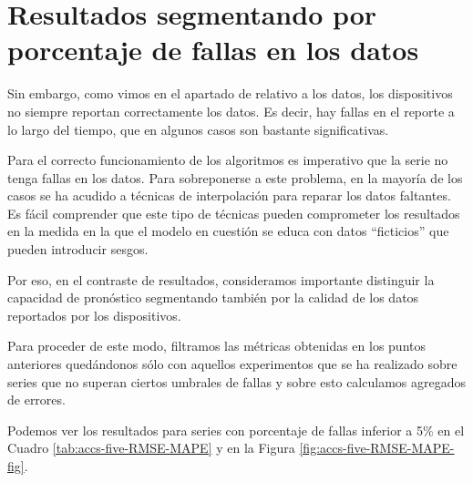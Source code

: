 \documentclass[]{book}
\begin{document}
\section{Resultados segmentando por porcentaje de fallas en los
datos}\label{resultados-segmentando-por-porcentaje-de-fallas-en-los-datos}

Sin embargo, como vimos en el apartado de relativo a los datos, los
dispositivos no siempre reportan correctamente los datos. Es decir, hay
fallas en el reporte a lo largo del tiempo, que en algunos casos son
bastante significativas.

Para el correcto funcionamiento de los algoritmos es imperativo que la
serie no tenga fallas en los datos. Para sobreponerse a este problema,
en la mayoría de los casos se ha acudido a técnicas de interpolación
para reparar los datos faltantes. Es fácil comprender que este tipo de
técnicas pueden comprometer los resultados en la medida en la que el
modelo en cuestión se educa con datos ``ficticios'' que pueden
introducir sesgos.

Por eso, en el contraste de resultados, consideramos importante
distinguir la capacidad de pronóstico segmentando también por la calidad
de los datos reportados por los dispositivos.

Para proceder de este modo, filtramos las métricas obtenidas en los
puntos anteriores quedándonos sólo con aquellos experimentos que se ha
realizado sobre series que no superan ciertos umbrales de fallas y sobre
esto calculamos agregados de errores.

Podemos ver los resultados para series con porcentaje de fallas inferior
a 5\% en el Cuadro \ref{tab:accs-five-RMSE-MAPE} y en la Figura
\ref{fig:accs-five-RMSE-MAPE-fig}.
\end{document}
